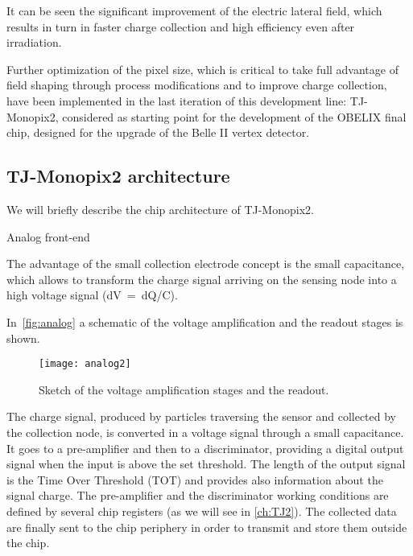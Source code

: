 It can be seen the significant improvement of the electric lateral field, which results in turn in faster charge collection and high efficiency even after irradiation. 

Further optimization of the pixel size, which is critical to take full advantage of field shaping through process modifications and to improve charge collection, have been implemented in the last iteration of this development line: TJ-Monopix2, considered as starting point for the development of the OBELIX final chip, designed for the upgrade of the Belle II vertex detector.


\subsection{TJ-Monopix2 architecture}\label{sec:TJ_arch}

We will briefly describe the chip architecture of TJ-Monopix2. 

\begin{description}
\item[Analog front-end]
\end{description}

The advantage of the small collection electrode concept is the small capacitance, which allows to transform the charge signal arriving on the sensing node into a high voltage signal (dV~=~dQ/C).

In~\autoref{fig:analog} a schematic of the voltage amplification and the readout stages is shown.

\begin{figure}[h!]
\centering
\texttt{[image: analog2]}
\caption{Sketch of the voltage amplification stages and the readout.}
\label{fig:analog}
\end{figure}

The charge signal, produced by particles traversing the sensor and collected by the collection node, is converted in a voltage signal through a small capacitance. It goes to a pre-amplifier and then to a discriminator, providing a digital output signal when the input is above the set threshold. The length of the output signal is the Time Over Threshold (TOT) and provides also information about the signal charge. 
The pre-amplifier and the discriminator working conditions are defined by several chip registers (as we will see in \autoref{ch:TJ2}). The collected data are finally sent to the chip periphery in order to transmit and store them outside the chip.\\


